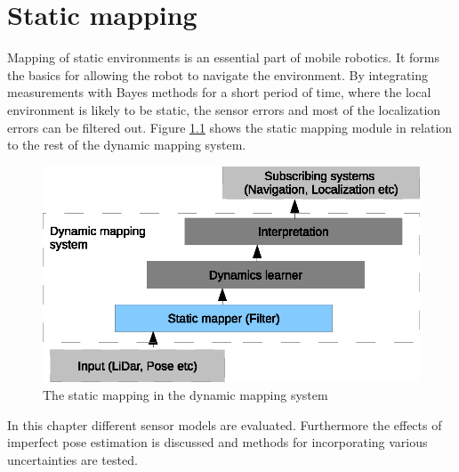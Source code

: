\chapter{Static mapping}
Mapping of static environments is an essential part of mobile robotics. It forms the basics for allowing the robot to navigate the environment. 
By integrating measurements with Bayes methods for a short period of time, where the local environment is likely to be static, the sensor errors and most of the localization errors can be filtered out.
Figure \ref{fig:static_map_overview} shows the static mapping module in relation to the rest of the dynamic mapping system.  

\begin{figure}[htbp]
		\centering
		\includegraphics[scale=1]{chapters/static_mapping/figures/static_map_overview.eps}
		\caption{The static mapping in the dynamic mapping system}
		\label{fig:static_map_overview}
\end{figure}

In this chapter different sensor models are evaluated. Furthermore the effects of imperfect pose estimation is discussed and methods for incorporating various uncertainties are tested. 





